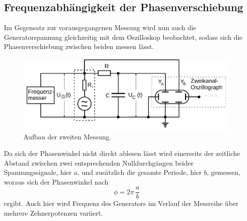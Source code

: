 \subsection{Frequenzabhängigkeit der Phasenverschiebung}
Im Gegensatz zur vorausgegangenen Messung wird nun auch die Generatorspannung gleichzeitig mit dem Oszilloskop beobachtet, sodass sich die Phasenverschiebung zwischen beiden messen lässt.
\begin{figure}[H]
    \centering
    \includegraphics[width=\textwidth]{content/aufbau3.png}
    \caption{Aufbau der zweiten Messung.\cite{v353}}
    \label{fig:mess3}
\end{figure}
\noindent
Da sich der Phasenwinkel nicht direkt ablesen lässt wird einerseits der zeitliche Abstand zwischen zwei entsprechenden Nulldurchgängen beider Spannungssignale, hier $a$, und zusätzlich die gesamte Periode, hier $b$, gemessen, woraus sich der Phasenwinkel nach
\begin{equation}
    \phi = 2\pi \, \frac{a}{b} 
    \label{eqn:abphase}
\end{equation}
ergibt.
Auch hier wird Frequenz des Generators im Verlauf der Messreihe über mehrere Zehnerpotenzen variiert.
